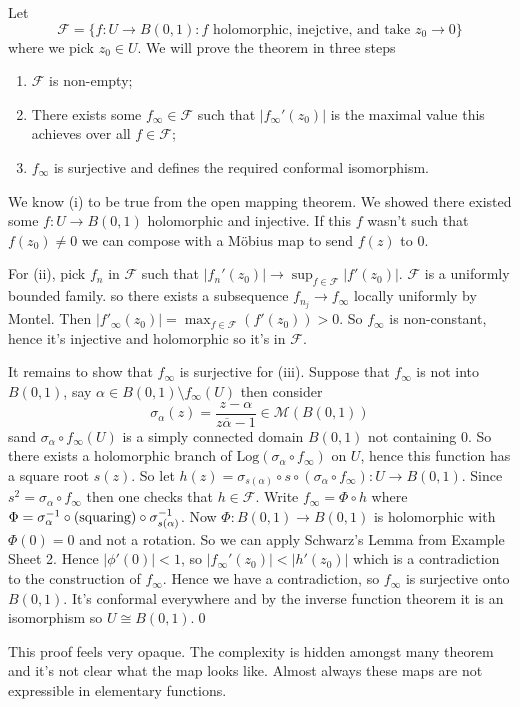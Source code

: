 \documentclass{article}
\newcommand{\Log}{\mathrm{Log}}
\begin{document}
\pf Let
\[
	\mathcal F = \{f:U\to B(0,1): f \text{ holomorphic, inejctive, and take } z_0 \to 0\}
\]
where we pick $ z_0 \in U $. We will prove the theorem in three steps
\begin{enumerate}
	\item $ \mathcal F $ is non-empty;
\item There exists some $ f_\infty\in \mathcal F $ such that $ |f_\infty'(z_0)| $ is the maximal value this achieves over all $ f\in \mathcal F $;
\item $ f_\infty $ is surjective and defines the required conformal isomorphism.
\end{enumerate}
We know (i) to be true from the open mapping theorem. We showed there existed some $ f:U\to B(0,1) $ holomorphic and injective. If this $ f $ wasn't such that $ f(z_0)\ne 0 $ we can compose with a M\"obius map to send $ f(z) $ to $ 0 $.
\par
For (ii), pick $ f_n $ in $ \mathcal F $ such that $ |f_n'(z_0)|\to \sup_{f\in \mathcal F}|f'(z_0)| $. $ \mathcal F $ is a uniformly bounded family. so there exists a subsequence $ f_{n_j}\to f_\infty $ locally uniformly by Montel. Then $ |f'_\infty(z_0)| = \max_{f\in \mathcal F}(f'(z_0)) > 0 $. So $ f_\infty  $ is non-constant, hence it's injective and holomorphic so it's in $ \mathcal F $.\par
It remains to show that $ f_\infty $ is surjective for (iii). Suppose that $ f_\infty $ is not into $ B(0,1) $, say $ \alpha \in B(0,1)\setminus f_\infty(U) $ then consider
\[
	\sigma_\alpha(z) = \frac{z-\alpha}{z\overline{\alpha} - 1} \in \mathcal M(B(0,1))
\]
sand $ \sigma_\alpha \circ f_\infty(U) $ is a simply connected domain $ B(0,1) $ not containing $ 0 $. So there exists a holomorphic branch of $ \Log(\sigma_\alpha\circ f_\infty) $ on $ U $, hence this function has a square root $ s(z) $. So let $ h(z) = \sigma_{s(\alpha)}\circ s\circ(\sigma_\alpha\circ f_\infty):U\to B(0,1) $. Since $ s^2=\sigma_\alpha\circ f_\infty $ then one checks that $ h\in \mathcal F $. Write $ f_\infty = \Phi\circ h $ where $ \Phi={\sigma}^{-1}_\alpha \circ (\text{squaring}) \circ {\sigma}^{-1}_{s(\alpha)} $. Now $ \Phi: B(0,1)\to B(0,1) $ is holomorphic with $ \Phi(0)= 0 $ and not a rotation. So we can apply Schwarz's Lemma from Example Sheet 2. Hence $ |\phi'(0)|<1 $, so $ |f_\infty'(z_0)| < |h'(z_0)| $ which is a contradiction to the construction of $ f_\infty $. Hence we have a contradiction, so $ f_\infty $ is surjective onto $ B(0,1) $. It's conformal everywhere and by the inverse function theorem it is an isomorphism so $ U\cong B(0,1) $.\qed
\par
\begin{remark}
  This proof feels very opaque. The complexity is hidden amongst many theorem and it's not clear what the map looks like. Almost always these maps are not expressible in elementary functions.
\end{remark}
\end{document}
